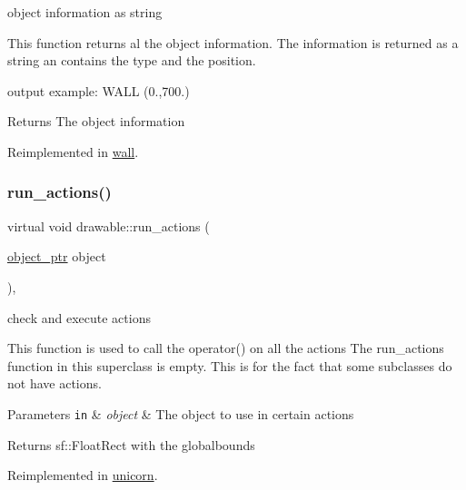 object information as string 

This function returns al the object information. The information is returned as a string an contains the type and the position.

output example\+: W\+A\+LL (0.,700.) \begin{DoxyReturn}{Returns}
The object information 
\end{DoxyReturn}


Reimplemented in \hyperlink{classwall_aab1de4f144f176b134a967ba08747932}{wall}.

\mbox{\label{classdrawable_a715df01a318331e5611a2b0ad30109ff}} 
\subsubsection{\texorpdfstring{run\+\_\+actions()}{run\_actions()}}
{\footnotesize\ttfamily virtual void drawable\+::run\+\_\+actions (\begin{DoxyParamCaption}\item[{\hyperlink{typedefs_8hpp_aab5add95f06d2ba25dbfed8eb07274fa}{object\+\_\+ptr}}]{object }\end{DoxyParamCaption})\hspace{0.3cm}{\ttfamily [inline]}, {\ttfamily [virtual]}}



check and execute actions 

This function is used to call the operator() on all the actions The run\+\_\+actions function in this superclass is empty. This is for the fact that some subclasses do not have actions. 
\begin{DoxyParams}[1]{Parameters}
\mbox{\tt in}  & {\em object} & The object to use in certain actions \\
\hline
\end{DoxyParams}
\begin{DoxyReturn}{Returns}
sf\+::\+Float\+Rect with the globalbounds 
\end{DoxyReturn}


Reimplemented in \hyperlink{classunicorn_aadb47a9981c46d6add8704074df117df}{unicorn}.

\mbox{\label{classdrawable_a5e40f2621daaca4ac32ef26b8c01b9a6}} 
